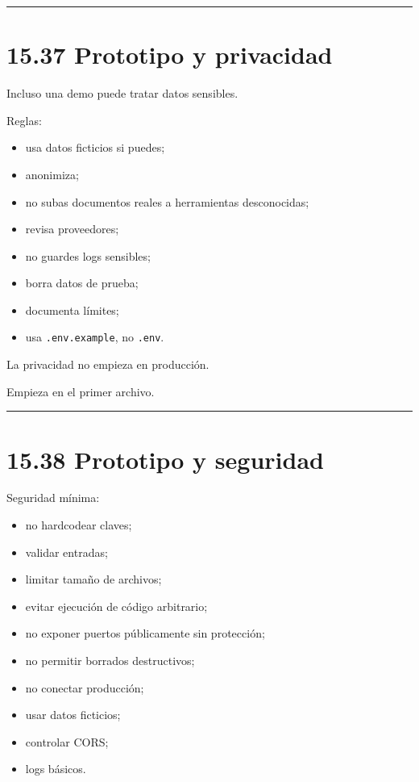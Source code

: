 \begin{center}\rule{0.5\linewidth}{0.5pt}\end{center}

\section{15.37 Prototipo y privacidad}\label{prototipo-y-privacidad}

Incluso una demo puede tratar datos sensibles.

Reglas:

\begin{itemize}
\tightlist
\item
  usa datos ficticios si puedes;
\item
  anonimiza;
\item
  no subas documentos reales a herramientas desconocidas;
\item
  revisa proveedores;
\item
  no guardes logs sensibles;
\item
  borra datos de prueba;
\item
  documenta límites;
\item
  usa \passthrough{\lstinline!.env.example!}, no
  \passthrough{\lstinline!.env!}.
\end{itemize}

La privacidad no empieza en producción.

Empieza en el primer archivo.

\begin{center}\rule{0.5\linewidth}{0.5pt}\end{center}

\section{15.38 Prototipo y seguridad}\label{prototipo-y-seguridad}

Seguridad mínima:

\begin{itemize}
\tightlist
\item
  no hardcodear claves;
\item
  validar entradas;
\item
  limitar tamaño de archivos;
\item
  evitar ejecución de código arbitrario;
\item
  no exponer puertos públicamente sin protección;
\item
  no permitir borrados destructivos;
\item
  no conectar producción;
\item
  usar datos ficticios;
\item
  controlar CORS;
\item
  logs básicos.
\end{itemize}

